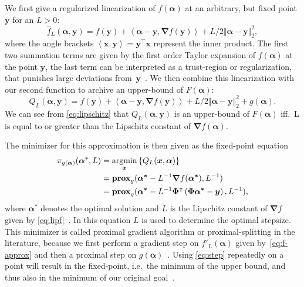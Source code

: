 We first give a regularized linearization of \(f(\bm{\alpha})\) at an arbitrary,
but fixed point \(\bm{y}\) for an \(L > 0\):
\begin{equation}\label{eq:f-approx}
  \hat{f}_L(\bm{\alpha}, \bm{y}) = f(\bm{y}) + \left< \bm{\alpha} - \bm{y}, \bm{\nabla} f (\bm{y}) \right> +
  L/2 \Vert \bm{\alpha} - \bm{y} \Vert_2^2,
\end{equation}
where the angle brackets \( \left< \bm{x}, \bm{y} \right> = \bm{y}^\intercal \bm{x} \) represent the inner product.
The first two summation terms are given by the first order Taylor expansion of \(f(\bm{\alpha})\) at the point \(\bm{y}\), the last term can be interpreted as a trust-region or regularization, that punishes large deviations from~\(\bm{y}\)~\cite{proxsurvey}.
We then combine this linearization with our second function to archive an upper-bound of \(F(\bm{\alpha})\):
\begin{equation}\label{eq:goal-approx}
  Q_L(\bm{\alpha}, \bm{y}) = f(\bm{y}) + \left< \bm{\alpha} - \bm{y}, \bm{\nabla} f (\bm{y}) \right> +
  L/2 \Vert \bm{\alpha} - \bm{y} \Vert_2^2 +
  g(\bm{\alpha}).
\end{equation}
We can see from \cref{eq:lipschitz} that \(Q_L(\bm{\alpha}, \bm{y})\) is an
upper-bound of \(F(\bm{\alpha})\) iff.~L is equal to or greater than the Lipschitz
constant of \(\bm{\nabla} f(\bm{\alpha})\).

The minimizer for this approximation is then given as the fixed-point equation
\begin{align}\label{eq:step}
  \pi_{g(\bm{\alpha})}(\bm{\alpha}^*, L) &=  \argmin_{\bm{x}} \left\{ Q_L(\bm{x}, \bm{\alpha}) \right\}\nonumber\\
       &= \prox[\(g\)]{\bm{\alpha^*} - L^{-1} \bm{\nabla} f (\bm{\alpha^*})}{L^{-1} } \nonumber\\
       &= \prox[\(g\)]{\bm{\alpha^*} - L^{-1} \bm{\Phi}^\intercal \left(\bm{\Phi} \bm{\alpha^*} - \bm{y} \right)}
         {L^{-1}},
\end{align}
where \(\bm{\alpha}^*\) denotes the optimal solution and \(L\) is the Lipschitz constant of \(\bm{\nabla} f\) given by \cref{eq:lipf}~\cite{fista}.
In this equation \(L\) is used to determine the optimal stepsize.
This minimizer is called proximal gradient algorithm or proximal-splitting in the literature, because we first perform a gradient step on \(f'_L(\bm{\alpha})\) given by~\ref{eq:f-approx} and then a proximal step on \(g(\bm{\alpha})\)~\cite{proxsurvey}.
Using \cref{eq:step} repeatedly on a point will result in the fixed-point, i.e.~the minimum of the upper bound, and thus also in the minimum of our original goal~\cite{proxsurvey}.

